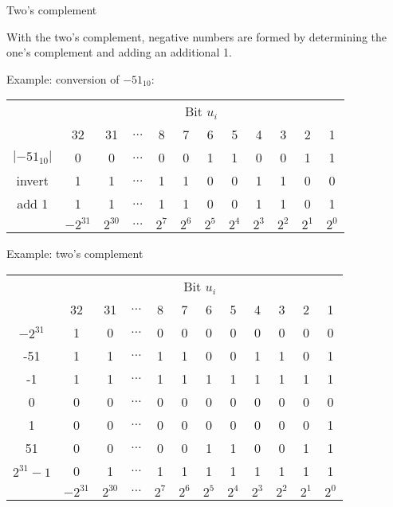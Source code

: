 \documentclass[11pt,compress,t,notes=noshow, xcolor=table]{beamer}
\begin{document}
\begin{vbframe}{Two's complement}

With the two's complement, negative numbers are formed by determining the one's complement and adding an additional 1.

\lz 

Example: conversion of $-51_{10}$:
\begin{footnotesize}
\begin{center}
  \begin{tabular}{ c | ccccccccccc}
      & \multicolumn{11}{c}{Bit $u_i$} \\
      & 32 & 31  & $\hdots$ & 8 & 7 & 6 & 5 & 4 & 3 & 2 & 1 \\
    \hline
    $|-51_{10}|$  & 0 & 0 & $\hdots$ & 0 & 0 & 1 & 1 & 0 & 0 & 1 & 1 \\
    invert & 1 & 1 & $\hdots$ & 1 & 1 & 0 & 0 & 1 & 1 & 0 & 0 \\
    add 1 & 1 & 1 & $\hdots$ & 1 & 1 & 0 & 0 & 1 & 1 & 0 & 1 \\
    \hline
      & $-2^{31}$ & $2^{30}$ & $\hdots$ & $2^7$ & $2^6$ & $2^5$ & $2^4$ & $2^3$ & $2^2$ & $2^1$ & $2^0$
  \end{tabular}
\end{center}
\end{footnotesize}

\framebreak


Example: two's complement
\begin{footnotesize}
\begin{center}
  \begin{tabular}{ c | ccccccccccc}
      & \multicolumn{11}{c}{Bit $u_i$} \\
      & 32 & 31  & $\hdots$ & 8 & 7 & 6 & 5 & 4 & 3 & 2 & 1 \\
    \hline
    $-2^{31}$    & 1 & 0 & $\hdots$ & 0 & 0 & 0 & 0 & 0 & 0 & 0 & 0 \\
    -51          & 1 & 1 & $\hdots$ & 1 & 1 & 0 & 0 & 1 & 1 & 0 & 1 \\
    -1           & 1 & 1 & $\hdots$ & 1 & 1 & 1 & 1 & 1 & 1 & 1 & 1 \\
    0            & 0 & 0 & $\hdots$ & 0 & 0 & 0 & 0 & 0 & 0 & 0 & 0 \\
    1            & 0 & 0 & $\hdots$ & 0 & 0 & 0 & 0 & 0 & 0 & 0 & 1 \\
    51           & 0 & 0 & $\hdots$ & 0 & 0 & 1 & 1 & 0 & 0 & 1 & 1 \\
    $2^{31}-1$   & 0 & 1 & $\hdots$ & 1 & 1 & 1 & 1 & 1 & 1 & 1 & 1 \\
    \hline
      & $-2^{31}$ & $2^{30}$ & $\hdots$ & $2^7$ & $2^6$ & $2^5$ & $2^4$ & $2^3$ & $2^2$ & $2^1$ & $2^0$
  \end{tabular}
\end{center}
\end{footnotesize}


\end{vbframe}
\end{document}

